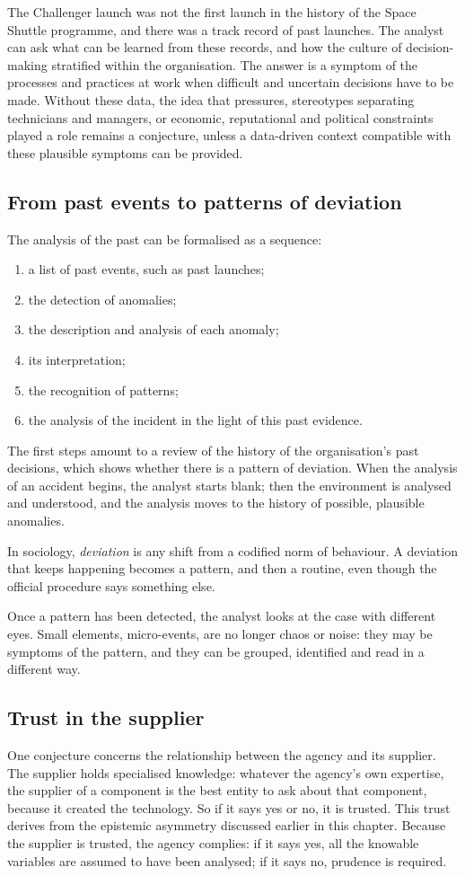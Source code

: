 The Challenger launch was not the first launch in the history of the Space Shuttle programme, and there was a track record of past launches. The analyst can ask what can be learned from these records, and how the culture of decision-making stratified within the organisation. The answer is a symptom of the processes and practices at work when difficult and uncertain decisions have to be made. Without these data, the idea that pressures, stereotypes separating technicians and managers, or economic, reputational and political constraints played a role remains a conjecture, unless a data-driven context compatible with these plausible symptoms can be provided.

\subsection{From past events to patterns of deviation}
The analysis of the past can be formalised as a sequence:
\begin{enumerate}
	\item a list of past events, such as past launches;
	\item the detection of anomalies;
	\item the description and analysis of each anomaly;
	\item its interpretation;
	\item the recognition of patterns;
	\item the analysis of the incident in the light of this past evidence.
\end{enumerate}
The first steps amount to a review of the history of the organisation's past decisions, which shows whether there is a pattern of deviation. When the analysis of an accident begins, the analyst starts blank; then the environment is analysed and understood, and the analysis moves to the history of possible, plausible anomalies.

In sociology, \emph{deviation} is any shift from a codified norm of behaviour. A deviation that keeps happening becomes a pattern, and then a routine, even though the official procedure says something else.

Once a pattern has been detected, the analyst looks at the case with different eyes. Small elements, micro-events, are no longer chaos or noise: they may be symptoms of the pattern, and they can be grouped, identified and read in a different way.

\subsection{Trust in the supplier}
One conjecture concerns the relationship between the agency and its supplier. The supplier holds specialised knowledge: whatever the agency's own expertise, the supplier of a component is the best entity to ask about that component, because it created the technology. So if it says yes or no, it is trusted. This trust derives from the epistemic asymmetry discussed earlier in this chapter. Because the supplier is trusted, the agency complies: if it says yes, all the knowable variables are assumed to have been analysed; if it says no, prudence is required.

